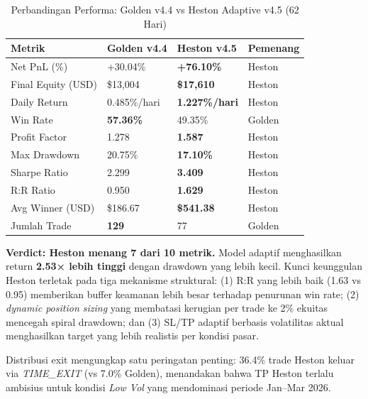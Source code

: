\begin{table}[h!]
\centering
\caption{Perbandingan Performa: Golden v4.4 vs Heston Adaptive v4.5 (62 Hari)}
\label{table:comparison_62d}
\begin{tabular}{@{}llll@{}}
\toprule
\textbf{Metrik}        & \textbf{Golden v4.4} & \textbf{Heston v4.5} & \textbf{Pemenang} \\ \midrule
Net PnL (\%)           & +30.04\%             & \textbf{+76.10\%}    & Heston \\
Final Equity (USD)     & \$13,004             & \textbf{\$17,610}    & Heston \\
Daily Return           & 0.485\%/hari         & \textbf{1.227\%/hari}& Heston \\
Win Rate               & \textbf{57.36\%}     & 49.35\%              & Golden \\
Profit Factor          & 1.278                & \textbf{1.587}       & Heston \\
Max Drawdown           & 20.75\%              & \textbf{17.10\%}     & Heston \\
Sharpe Ratio           & 2.299                & \textbf{3.409}       & Heston \\
R:R Ratio              & 0.950                & \textbf{1.629}       & Heston \\
Avg Winner (USD)       & \$186.67             & \textbf{\$541.38}    & Heston \\
Jumlah Trade           & \textbf{129}         & 77                   & Golden \\
\bottomrule
\end{tabular}
\end{table}

\textbf{Verdict: Heston menang 7 dari 10 metrik.} Model adaptif menghasilkan return \textbf{2.53× lebih tinggi} dengan drawdown yang lebih kecil. Kunci keunggulan Heston terletak pada tiga mekanisme struktural: (1) R:R yang lebih baik (1.63 vs 0.95) memberikan buffer keamanan lebih besar terhadap penurunan win rate; (2) \textit{dynamic position sizing} yang membatasi kerugian per trade ke 2\% ekuitas mencegah spiral drawdown; dan (3) SL/TP adaptif berbasis volatilitas aktual menghasilkan target yang lebih realistis per kondisi pasar.

Distribusi exit mengungkap satu peringatan penting: 36.4\% trade Heston keluar via \textit{TIME\_EXIT} (vs 7.0\% Golden), menandakan bahwa TP Heston terlalu ambisius untuk kondisi \textit{Low Vol} yang mendominasi periode Jan--Mar 2026.

